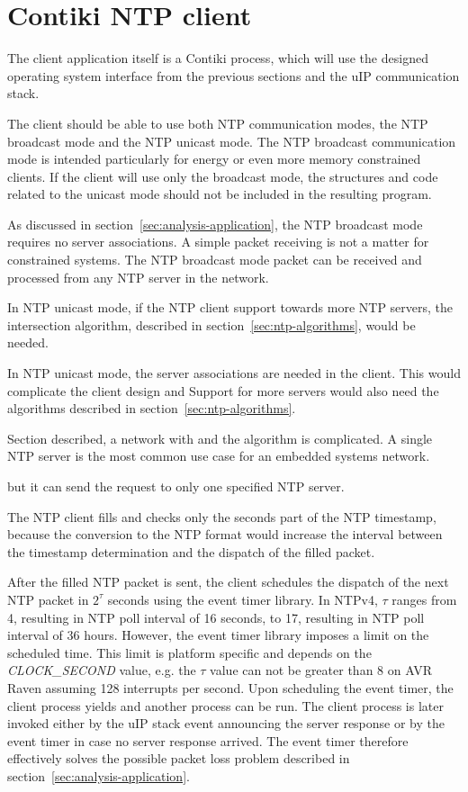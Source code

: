 
\section{Contiki NTP client}\label{sec:design-client}
The client application itself is a Contiki process,
which will use the designed operating system interface from the previous sections
and the uIP communication stack.

The client should be able to use both NTP communication modes,
the NTP broadcast mode and the NTP unicast mode.
The NTP broadcast communication mode is intended particularly for energy or
even more memory constrained clients.
If the client will use only the broadcast mode, the structures and code
related to the unicast mode should not be included in the resulting program.


As discussed in section~\ref{sec:analysis-application}, the NTP broadcast mode requires no server
associations.
A simple packet receiving is not a matter for constrained systems.
The NTP broadcast mode packet can be received and processed from any NTP server in the network.


In NTP unicast mode, if the NTP client support towards more NTP servers,
the intersection algorithm, described in section~\ref{sec:ntp-algorithms}, would be needed.

In NTP unicast mode, the server associations are needed in the client.
This would complicate the client design and 
Support for more servers would also need the algorithms described in section~\ref{sec:ntp-algorithms}.

Section described, a network with
and the algorithm is complicated.
A single NTP server is the most common use case for an embedded systems network.

but it can send the request to only one specified NTP server.



The NTP client fills and checks only the seconds part of the NTP timestamp,
because the conversion to the NTP format would increase the interval
between the timestamp determination and the dispatch of the filled packet.

After the filled NTP packet is sent, the client schedules
the dispatch of the next NTP packet in $2^{\tau}$ seconds
using the event timer library.
In NTPv4, $\tau$ ranges from 4, resulting in NTP poll interval of 16 seconds,
to 17, resulting in NTP poll interval of 36 hours.
However, the event timer library imposes a limit on the scheduled time.
This limit is platform specific and depends on the {\it{CLOCK\_SECOND}} value,
e.g. the $\tau$ value can not be greater than 8 on AVR Raven assuming 128 interrupts per second.
Upon scheduling the event timer, the client process yields
and another process can be run.
The client process is later invoked either by the uIP stack event
announcing the server response
or by the event timer in case no server response arrived.
The event timer therefore effectively solves
the possible packet loss problem described in section~\ref{sec:analysis-application}.


